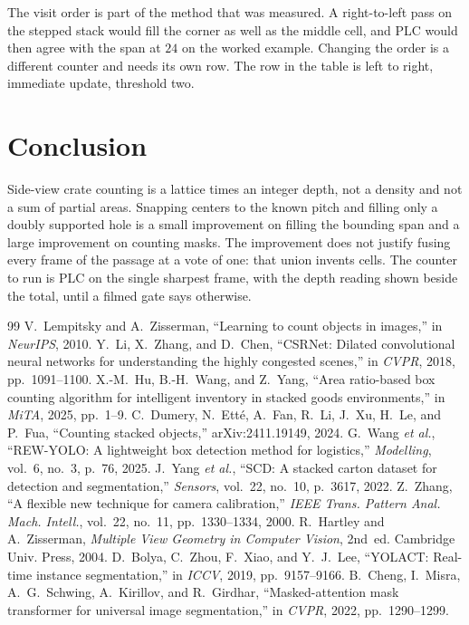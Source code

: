 \documentclass[10pt]{article}
\begin{document}
The visit order is part of the method that was measured. A right-to-left pass on the stepped stack would fill the corner as well as the middle cell, and PLC would then agree with the span at $24$ on the worked example. Changing the order is a different counter and needs its own row. The row in the table is left to right, immediate update, threshold two.

\section{Conclusion}
Side-view crate counting is a lattice times an integer depth, not a density and not a sum of partial areas. Snapping centers to the known pitch and filling only a doubly supported hole is a small improvement on filling the bounding span and a large improvement on counting masks. The improvement does not justify fusing every frame of the passage at a vote of one: that union invents cells. The counter to run is PLC on the single sharpest frame, with the depth reading shown beside the total, until a filmed gate says otherwise.

\begin{thebibliography}{99}
 V.~Lempitsky and A.~Zisserman, ``Learning to count objects in images,'' in \emph{NeurIPS}, 2010.
 Y.~Li, X.~Zhang, and D.~Chen, ``CSRNet: Dilated convolutional neural networks for understanding the highly congested scenes,'' in \emph{CVPR}, 2018, pp.~1091--1100.
 X.-M.~Hu, B.-H.~Wang, and Z.~Yang, ``Area ratio-based box counting algorithm for intelligent inventory in stacked goods environments,'' in \emph{MiTA}, 2025, pp.~1--9.
 C.~Dumery, N.~Ett\'e, A.~Fan, R.~Li, J.~Xu, H.~Le, and P.~Fua, ``Counting stacked objects,'' arXiv:2411.19149, 2024.
 G.~Wang \emph{et al.}, ``REW-YOLO: A lightweight box detection method for logistics,'' \emph{Modelling}, vol.~6, no.~3, p.~76, 2025.
 J.~Yang \emph{et al.}, ``SCD: A stacked carton dataset for detection and segmentation,'' \emph{Sensors}, vol.~22, no.~10, p.~3617, 2022.
 Z.~Zhang, ``A flexible new technique for camera calibration,'' \emph{IEEE Trans. Pattern Anal. Mach. Intell.}, vol.~22, no.~11, pp.~1330--1334, 2000.
 R.~Hartley and A.~Zisserman, \emph{Multiple View Geometry in Computer Vision}, 2nd~ed. Cambridge Univ. Press, 2004.
 D.~Bolya, C.~Zhou, F.~Xiao, and Y.~J.~Lee, ``YOLACT: Real-time instance segmentation,'' in \emph{ICCV}, 2019, pp.~9157--9166.
 B.~Cheng, I.~Misra, A.~G.~Schwing, A.~Kirillov, and R.~Girdhar, ``Masked-attention mask transformer for universal image segmentation,'' in \emph{CVPR}, 2022, pp.~1290--1299.
\end{thebibliography}
\end{document}
